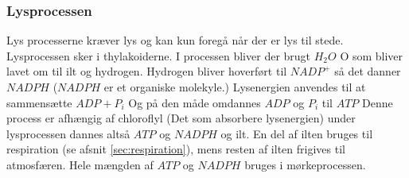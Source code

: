            \subsubsection*{Lysprocessen}
                Lys processerne kræver lys og kan kun foregå når der er lys til stede. Lysprocessen sker i thylakoiderne. I processen bliver der brugt \begin{math}H_2O\end{math} O som bliver lavet om til ilt og hydrogen. Hydrogen bliver hoverført til \begin{math}NADP^+\end{math} så det danner \begin{math}NADPH\end{math} (\begin{math}NADPH\end{math} er et organiske molekyle.) 
                Lysenergien anvendes til at sammensætte \begin{math}ADP + P_i\end{math} Og på den måde omdannes \begin{math}ADP\end{math} og \begin{math}P_i\end{math} til \begin{math}ATP\end{math} Denne process er afhængig af chloroflyl (Det som absorbere lysenergien) under lysprocessen dannes altså \begin{math}ATP\end{math} og \begin{math}NADPH\end{math} og ilt. En del af ilten bruges til respiration (se afsnit \ref{sec:respiration}), mens resten af ilten frigives til atmosfæren. Hele mængden af \begin{math}ATP\end{math} og \begin{math}NADPH\end{math} bruges i mørkeprocessen. 

